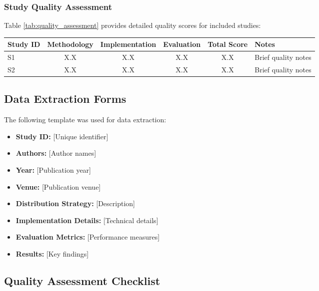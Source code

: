 \subsubsection{Study Quality Assessment}
Table \ref{tab:quality_assessment} provides detailed quality scores for included studies:

\begin{table*}[htbp!]
    \centering
    \caption{Quality Assessment Scores for Included Studies}
    \label{tab:quality_assessment}
    \begin{tabularx}{\textwidth}{|l|c|c|c|c|X|}
        \hline
        \textbf{Study ID} & \textbf{Methodology} & \textbf{Implementation} & \textbf{Evaluation} & \textbf{Total Score} & \textbf{Notes} \\
        \hline
        S1 & X.X & X.X & X.X & X.X & Brief quality notes \\
        \hline
        S2 & X.X & X.X & X.X & X.X & Brief quality notes \\
        \hline
    \end{tabularx}
\end{table*}

\subsection{Data Extraction Forms}
\label{sec:data_extraction}

The following template was used for data extraction:
\begin{itemize}
    \item \textbf{Study ID:} [Unique identifier]
    \item \textbf{Authors:} [Author names]
    \item \textbf{Year:} [Publication year]
    \item \textbf{Venue:} [Publication venue]
    \item \textbf{Distribution Strategy:} [Description]
    \item \textbf{Implementation Details:} [Technical details]
    \item \textbf{Evaluation Metrics:} [Performance measures]
    \item \textbf{Results:} [Key findings]
\end{itemize}

\subsection{Quality Assessment Checklist}
\label{sec:quality_checklist}

